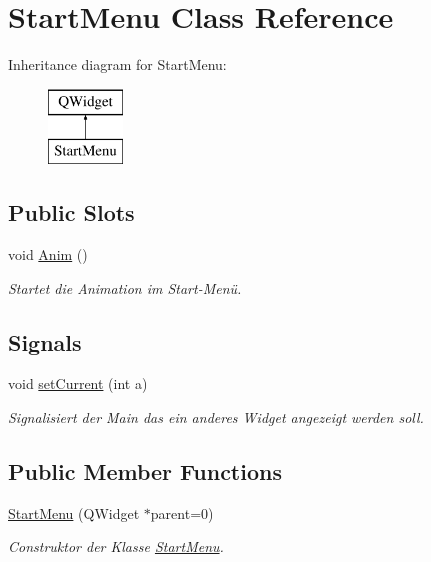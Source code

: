 \hypertarget{class_start_menu}{}\section{Start\+Menu Class Reference}
\label{class_start_menu}
Inheritance diagram for Start\+Menu\+:\begin{figure}[H]
\begin{center}
\leavevmode
\includegraphics[height=2.000000cm]{class_start_menu}
\end{center}
\end{figure}
\subsection*{Public Slots}
\begin{DoxyCompactItemize}
\item 
void \hyperlink{class_start_menu_a3454310eae3e51ebfcd00b9837e0cd71}{Anim} ()
\begin{DoxyCompactList}\small\item\em Startet die Animation im Start-\/\+Menü. \end{DoxyCompactList}\end{DoxyCompactItemize}
\subsection*{Signals}
\begin{DoxyCompactItemize}
\item 
void \hyperlink{class_start_menu_a5ec52ec6f45dffd4ded1592b4bb9526f}{set\+Current} (int a)
\begin{DoxyCompactList}\small\item\em Signalisiert der Main das ein anderes Widget angezeigt werden soll. \end{DoxyCompactList}\end{DoxyCompactItemize}
\subsection*{Public Member Functions}
\begin{DoxyCompactItemize}
\item 
\hyperlink{class_start_menu_a1491fb2672b951483f3cfc0594571fbb}{Start\+Menu} (Q\+Widget $\ast$parent=0)
\begin{DoxyCompactList}\small\item\em Construktor der Klasse \hyperlink{class_start_menu}{Start\+Menu}. \end{DoxyCompactList}\end{DoxyCompactItemize}
